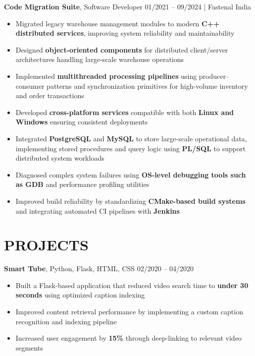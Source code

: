 \documentclass[11.9pt,a4paper]{article}
\begin{document}
\noindent
\textbf{Code Migration Suite}, Software Developer \hfill 01/2021 -- 09/2024 | Fastenal India
\begin{itemize}
  \item Migrated legacy warehouse management modules to modern \textbf{C++ distributed services}, improving system reliability and maintainability
  \item Designed \textbf{object-oriented components} for distributed client/server architectures handling large-scale warehouse operations
  \item Implemented \textbf{multithreaded processing pipelines} using producer--consumer patterns and synchronization primitives for high-volume inventory and order transactions
  \item Developed \textbf{cross-platform services} compatible with both \textbf{Linux and Windows} ensuring consistent deployments
 \item Integrated \textbf{PostgreSQL} and \textbf{MySQL} to store large-scale operational data, implementing stored procedures and query logic using \textbf{PL/SQL} to support distributed system workloads
  \item Diagnosed complex system failures using \textbf{OS-level debugging tools such as GDB} and performance profiling utilities
  \item Improved build reliability by standardizing \textbf{CMake-based build systems} and integrating automated CI pipelines with \textbf{Jenkins}
\end{itemize}

\vspace{6pt}

\section*{PROJECTS}

\noindent
\textbf{Smart Tube}, Python, Flask, HTML, CSS \hfill 02/2020 -- 04/2020
\begin{itemize}
  \item Built a Flask-based application that reduced video search time to \textbf{under 30 seconds} using optimized caption indexing
  \item Improved content retrieval performance by implementing a custom caption recognition and indexing pipeline
  \item Increased user engagement by \textbf{15\%} through deep-linking to relevant video segments
\end{itemize}
\end{document}
